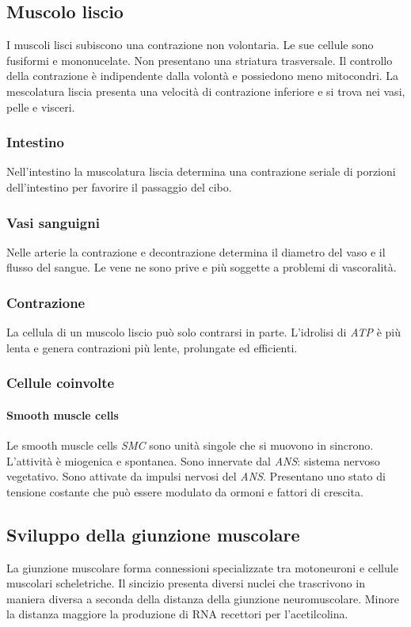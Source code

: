 	\subsection{Muscolo liscio}
	I muscoli lisci subiscono una contrazione non volontaria.
	Le sue cellule sono fusiformi e mononucelate.
	Non presentano una striatura trasversale.
	Il controllo della contrazione \`e indipendente dalla volont\`a e possiedono meno mitocondri.
	La mescolatura liscia presenta una velocit\`a di contrazione inferiore e si trova nei vasi, pelle e visceri.
	
		\subsubsection{Intestino}
		Nell'intestino la muscolatura liscia determina una contrazione seriale di porzioni dell'intestino per favorire il passaggio del cibo.

		\subsubsection{Vasi sanguigni}
		Nelle arterie la contrazione e decontrazione determina il diametro del vaso e il flusso del sangue.
		Le vene ne sono prive e pi\`u soggette a problemi di vascoralit\`a.

		\subsubsection{Contrazione}
		La cellula di un muscolo liscio pu\`o solo contrarsi in parte.
		L'idrolisi di \emph{ATP} \`e pi\`u lenta e genera contrazioni pi\`u lente, prolungate ed efficienti.

		\subsubsection{Cellule coinvolte}

			\paragraph{Smooth muscle cells}
			Le smooth muscle cells \emph{SMC} sono unit\`a singole che si muovono in sincrono.
			L'attivit\`a \`e miogenica e spontanea.
			Sono innervate dal \emph{ANS}: sistema nervoso vegetativo.
			Sono attivate da impulsi nervosi del \emph{ANS}.
			Presentano uno stato di tensione costante che pu\`o essere modulato da ormoni e fattori di crescita.

	\subsection{Sviluppo della giunzione muscolare}
	La giunzione muscolare forma connessioni specializzate tra motoneuroni e cellule muscolari scheletriche.
	Il sincizio presenta diversi nuclei che trascrivono in maniera diversa a seconda della distanza della giunzione neuromuscolare.
	Minore la distanza maggiore la produzione di RNA recettori per l'acetilcolina.

